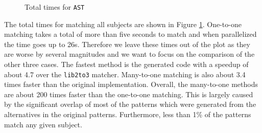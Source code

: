 \documentclass[conference,compsoc]{IEEEtran}
\begin{document}
\begin{figure}[h]
    \centering
    \vspace{-\baselineskip}
    \caption{Total times for \texttt{AST}}\label{fig:prop-times}
\end{figure}

The total times for matching all subjects are shown in Figure \ref{fig:prop-times}.
One-to-one matching takes a total of more than five seconds to match and when parallelized the time goes up to 26s.
Therefore we leave these times out of the plot as they are worse by several magnitudes and we want to focus on the comparison of the other three cases.
The fastest method is the generated code with a speedup of about 4.7 over the \texttt{lib2to3} matcher.
Many-to-one matching is also about 3.4 times faster than the original implementation.
Overall, the many-to-one methods are about 200 times faster than the one-to-one matching.
This is largely caused by the significant overlap of most of the patterns which were generated from the alternatives in the original patterns.
Furthermore, less than 1\% of the patterns match any given subject.

\end{document}
